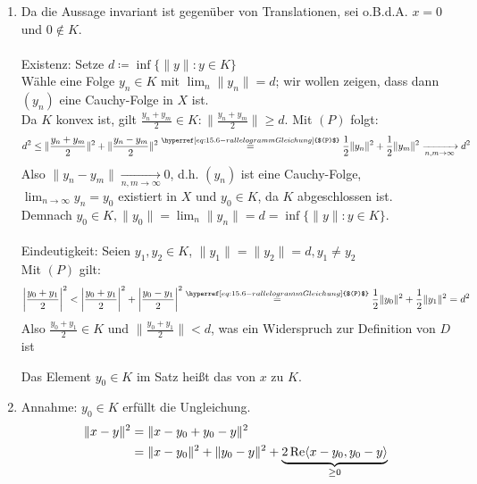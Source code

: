 \begin{beweis}
	\begin{enumerate}[label=\alph*\upshape)]
		\item Da die Aussage invariant ist gegenüber von Translationen, sei o.B.d.A. $x = 0$ und $0 \notin K$. \\ \\
			Existenz: Setze $d \coloneqq \inf \{ \| y \| : y \in K \}$ \\
			Wähle eine Folge $y_{n} \in K$ mit $\lim_{n} \| y_{n} \| = d$; wir wollen zeigen, dass dann $(y_{n})$ eine Cauchy-Folge in $X$ ist. \\
			Da $K$ konvex ist, gilt $\frac{y_{n} + y_{m}}{2} \in K: \| \frac{y_{n} + y_{m}}{2} \| \geq d$. Mit \hyperref[eq:15.6-rallelogrammGleichung]{$(P)$} folgt:
			\[ d^{2} \leq \| \frac{y_{n} + y_{m}}{2} \|^{2} + \| \frac{y_{n} - y_{m}}{2} \|^{2} \overset{\hyperref[eq:15.6-rallelogrammGleichung]{$(P)$}}{=} \frac{1}{2} \| y_{n} \|^{2} + \frac{1}{2} \| y_{m} \|^{2} \xrightarrow[n, m \rightarrow \infty]{} d^{2} \]
			Also $\| y_{n} - y_{m} \| \xrightarrow[n, m \rightarrow \infty]{} 0$, d.h. $(y_{n})$ ist eine Cauchy-Folge, $\lim_{n \rightarrow \infty} y_{n} = y_{0}$ existiert in $X$ und $y_{0} \in K$, da $K$ abgeschlossen ist. \\
			Demnach $y_{0} \in K, \| y_{0} \| = \lim_{n} \| y_{n} \| = d = \inf \{ \| y \| : y \in K \}$. \\ \\
			Eindeutigkeit: Seien $y_{1}, y_{2} \in K$, $\|y_{1} \| = \|y_{2} \| = d, y_{1} \neq y_{2}$ \\
			Mit \hyperref[eq:15.6-rallelogrammGleichung]{$(P)$} gilt:
			\[ \left| \frac{y_{0} + y_{1}}{2} \right|^{2} < \left| \frac{y_{0} + y_{1}}{2} \right|^{2} + \left| \frac{y_{0} - y_{1}}{2} \right|^{2} \overset{\hyperref[eq:15.6-rallelogrammGleichung]{$(P)$}}{=} \frac{1}{2} \| y_{0} \|^{2} + \frac{1}{2} \| y_{1} \|^{2} = d^{2} \]
			Also $\frac{y_{0} + y_{1}}{2} \in K$ und $ \| \frac{y_{0} + y_{1}}{2} \| < d$, was ein Widerspruch zur Definition von $D$ ist
			\begin{vereinbarung}
				Das Element $y_{0} \in K$ im Satz hei{\ss}t das  von $x$ zu $K$.
			\end{vereinbarung}
		\item Annahme: $y_{0} \in K$ erfüllt die Ungleichung. 
			\begin{align*}
				\| x - y \|^{2} & = \| x - y_{0} + y_{0} - y \|^{2} \\
								& = \| x - y_{0} \|^{2} + \| y_{0} - y \|^{2} + \underbrace{2 \Re \< x - y_{0}, y_{0} - y \>}_{ \geq 0} \\

\end{align*}
\end{enumerate}
\end{beweis}
